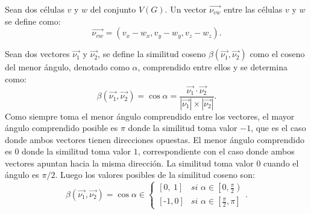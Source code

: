 \begin{definition}
\label{def-general-vector}
Sean dos c\'elulas $v$ y $w$ del conjunto $V(G)$. Un vector $\overrightarrow{\nu_{vw}}$ entre las c\'elulas $v$ y $w$ se define como:
\begin{equation}
\overrightarrow{\nu_{vw}} = \left(v_x - w_x, v_y - w_y, v_z - w_z \right). \label{eq-general-vector}
\end{equation}
\end{definition}

\begin{definition}
\label{def-sim}
Sean dos vectores $\overrightarrow{\nu_1}$ y $\overrightarrow{\nu_2}$, se define la similitud coseno $\beta(\overrightarrow{\nu_1},\overrightarrow{\nu_2})$ como el coseno del menor \'angulo, denotado como $\alpha$, comprendido entre ellos y se determina como:
\begin{equation}
\beta(\overrightarrow{\nu_1},\overrightarrow{\nu_2}) = \cos \alpha = \displaystyle\frac{\overrightarrow{\nu_1} \cdot \overrightarrow{\nu_2}}{|\overrightarrow{\nu_1}| \times |\overrightarrow{\nu_2}|}. \label{eq-sim}
\end{equation}
Como siempre toma el menor \'angulo comprendido entre los vectores, el mayor \'angulo comprendido posible es $\pi$ donde la similitud toma valor $-1$, que es el caso donde ambos vectores tienen direcciones opuestas. El menor \'angulo comprendido es $0$ donde la similitud toma valor $1$, correspondiente con el caso donde ambos vectores apuntan hacia la misma direcci\'on. La similitud toma valor $0$ cuando el \'angulo es $\pi /2$. Luego los valores posibles de la similitud coseno son:
\begin{equation}
\beta(\overrightarrow{\nu_1},\overrightarrow{\nu_2}) = \cos \alpha \in \left\lbrace
	\begin{array}{ll}
		\left[0,~1\right]& \textit{si } \alpha \in \left[0,\frac{\pi}{2} \right)\\
		\left[\textit{-}1,0\right]& \textit{si } \alpha \in \left[\frac{\pi}{2}, \pi \right]
	\end{array}
\right..
\end{equation}
\end{definition}

